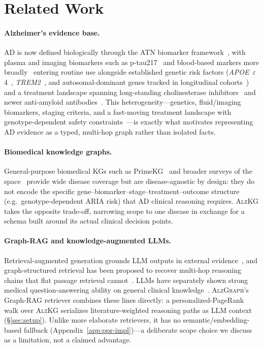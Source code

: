 \documentclass{article}
\begin{document}
\newpage
\section{Related Work}
\label{app:related}

\paragraph{Alzheimer's evidence base.} AD is now defined biologically through the ATN biomarker framework~\citep{jack2018nia}, with plasma and imaging biomarkers such as p-tau217~\citep{palmqvist2020ptau217} and blood-based markers more broadly~\citep{hampel2018blood} entering routine use alongside established genetic risk factors (\textit{APOE}~$\varepsilon$4~\citep{corder1993apoe}, \textit{TREM2}~\citep{guerreiro2013trem2}, and autosomal-dominant genes tracked in longitudinal cohorts~\citep{bateman2012dian}) and a treatment landscape spanning long-standing cholinesterase inhibitors~\citep{birks2018donepezil} and newer anti-amyloid antibodies~\citep{vandyck2023lecanemab,sims2023donanemab,buddhaeberlein2022aducanumab}. This heterogeneity---genetics, fluid/imaging biomarkers, staging criteria, and a fast-moving treatment landscape with genotype-dependent safety constraints~\citep{cummings2023auc}---is exactly what motivates representing AD evidence as a typed, multi-hop graph rather than isolated facts.

\paragraph{Biomedical knowledge graphs.} General-purpose biomedical KGs such as PrimeKG~\citep{chandak2023primekg} and broader surveys of the space~\citep{cui2025kghealth} provide wide disease coverage but are disease-agnostic by design: they do not encode the specific gene--biomarker--stage--treatment--outcome structure (e.g.\ genotype-dependent ARIA risk) that AD clinical reasoning requires. \textsc{AlzKG} takes the opposite trade-off, narrowing scope to one disease in exchange for a schema built around its actual clinical decision points.

\paragraph{Graph-RAG and knowledge-augmented LLMs.} Retrieval-augmented generation grounds LLM outputs in external evidence~\citep{lewis2020rag}, and graph-structured retrieval has been proposed to recover multi-hop reasoning chains that flat passage retrieval cannot~\citep{edge2024graphrag}. LLMs have separately shown strong medical question-answering ability on general clinical knowledge~\citep{singhal2023llm}. \textsc{AlzGraph}'s Graph-RAG retriever combines these lines directly: a personalized-PageRank walk over \textsc{AlzKG} serializes literature-weighted reasoning paths as LLM context (\S\ref{sec:setup}). Unlike more elaborate retrievers, it has no semantic/embedding-based fallback (Appendix~\ref{app:ppr-impl})---a deliberate scope choice we discuss as a limitation, not a claimed advantage.
\end{document}

